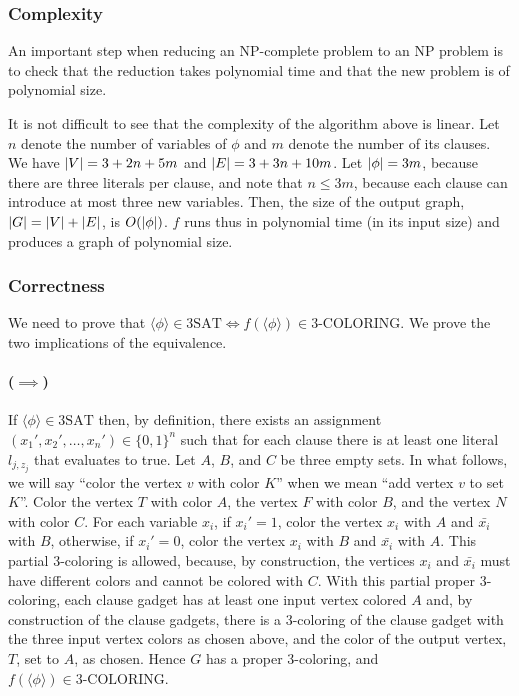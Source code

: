 \subsubsection{Complexity}
An important step when reducing an NP-complete problem to an NP problem is to
check that the reduction takes polynomial time and that the new problem is of
polynomial size.

It is not difficult to see that the complexity of the algorithm above is
linear. Let $n$ denote the number of variables of $\phi$ and $m$ denote the
number of its clauses. We have $|V| = 3 + 2n + 5m$ and $|E| = 3 +
3n + 10m$. Let $|\phi| = 3m$, because there are three literals per clause,
and note that $n \le 3m$, because each clause can introduce at most three new
variables. Then, the size of the output graph, $|G| = |V| + |E|$,
is $O(|\phi|)$. $f$ runs thus in polynomial time (in its input size)
and produces a graph of polynomial size.

\subsubsection{Correctness}

We need to prove that $\langle \phi \rangle \in \text{3SAT} \iff f(\langle \phi \rangle) \in
\text{3-COLORING}$. We prove the two implications of the equivalence.

\paragraph{($\implies$)} If $\langle\phi\rangle \in \text{3SAT}$ then, by definition,
there exists an assignment $(x_1', x_2', \ldots, x_n') \in \{0,1\}^n$ such
that for each clause there is at least one literal $l_{j,z_j}$ that evaluates
to true.
Let $A$, $B$, and $C$ be three empty sets. In what follows, we will say ``color the
vertex $v$ with color $K$'' when we mean ``add vertex $v$ to set $K$''.
%
Color the vertex $T$ with color $A$,
the vertex $F$ with color $B$, and
the vertex $N$ with color $C$.
For each variable $x_i$, if $x_i'=1$, color the vertex $x_i$ with $A$ and
$\bar{x_i}$ with $B$, otherwise, if $x_i'=0$, color the vertex
$x_i$ with $B$ and $\bar{x_i}$ with $A$. This partial 3-coloring is allowed,
because, by construction, the vertices $x_i$ and $\bar{x_i}$ must
have different colors and cannot be colored with $C$. With this partial proper
3-coloring, each clause gadget has at least
one input vertex colored $A$ and, by construction of the clause gadgets,
there is a 3-coloring of the clause gadget with the three input vertex colors
as chosen above, and the color of the output vertex, $T$, set to $A$, as
chosen. Hence $G$ has a proper 3-coloring,
and $f(\langle \phi \rangle) \in \text{3-COLORING}$.

